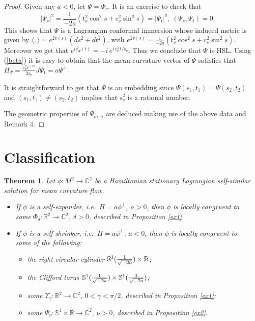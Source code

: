 \documentclass[leqno,11pt]{amsart}
\newtheorem{theorem}{Theorem}
\begin{document}
\begin{proof}
Given any $a<0$, let $\Psi=\Psi_\nu$. It is an exercise to check
that
$$
|\Psi_s|^2=\frac{1}{-2a}\left( \mathrm{t}_\nu^2\cos^2 s
+\mathrm{c}_\nu^2 \sin^2 s\right)=|\Psi_t|^2, \ (\Psi_s,\Psi_t)=0.
$$
This shows that $\Psi$ is a Lagrangian conformal immersion whose
induced metric is given by $\langle ,
\rangle=e^{2v(s)}\left(ds^2+dt^2\right)$, with $e^{2v(s)}
=\frac{1}{-2a}\left( \mathrm{t}_\nu^2\cos^2 s +\mathrm{c}_\nu^2
\sin^2 s\right)$. Moreover we get that $e^{i\beta_{\Psi}(t)}=
-i\,e^{i\,\mathrm{c}_\nu^2 \,t / \mathrm{s}_\nu}$. Thus we
conclude that $\Psi $ is HSL. Using (\ref{beta}) it is easy to
obtain that the mean curvature vector of $\Psi$ satisfies that $
H_\Psi=\frac{\mathrm{c}_\nu^2 e^{-2v}}{2\mathrm{s}_\nu}J\Psi_t=a
\Psi^\perp $.

It is straightforward to get that $\Psi $ is an embedding since
$\Psi(s_1,t_1)=\Psi(s_2,t_2)$ and $(s_1,t_1)\neq (s_2,t_2)$
implies that $\mathrm{s}_\nu^2$ is a rational number.

The geometric properties of $\Psi_{m,n}$ are deduced making use of
the above data and Remark 4.
\end{proof}

\section{Classification}

\begin{theorem}\label{main}
Let $\phi: M^2 \rightarrow {\mathbb{C}}^2 $ be a Hamiltonian stationary Lagrangian self-similar solution for
mean curvature flow.
\begin{itemize}
\item[(a)] If $\phi$ is a self-expander, i.e.\ $H=a\phi^\perp$, $a>0$, then $\phi $ is locally congruent
to some $\Phi_\delta:{\mathbb{R}}^2 \rightarrow {\mathbb{C}}^2$, $\delta>0$, described
in Proposition \ref{ex1}.
\item[(b)] If $\phi$ is a self-shrinker, i.e.\ $H=a\phi^\perp$, $a<0$, then $\phi $ is locally congruent
to some of the following:
\begin{itemize}
\item[(i)] the right circular cylinder ${\mathbb{S}}^1({1 \over \sqrt{-2a}})\times {\mathbb{R}}$;
\item[(ii)] the Clifford torus ${\mathbb{S}}^1({1\over \sqrt{-2a}})\times {\mathbb{S}}^1({1\over\sqrt{-2a}})$;
\item[(iii)] some $\Upsilon_\gamma:{\mathbb{R}}^2 \rightarrow {\mathbb{C}}^2$, $0<\gamma<\pi/2 $, described in Proposition \ref{ex1};
\item[(iv)] some $\Psi_\nu:{\mathbb{S}}^1 \times {\mathbb{R}} \rightarrow {\mathbb{C}}^2$, $\nu >0 $, described in Proposition \ref{ex2}.
\end{itemize}
\end{itemize}
\end{theorem}
\end{document}
